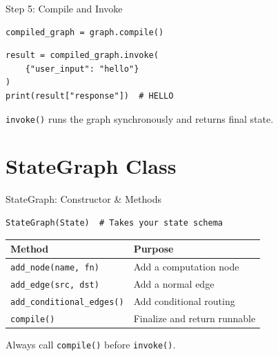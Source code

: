 \documentclass[aspectratio=169,11pt]{beamer}
\begin{document}
\begin{frame}[fragile,t]{Step 5: Compile and Invoke}
\vspace{0.1cm}

\begin{codebox}[Compile]
\begin{lstlisting}
compiled_graph = graph.compile()
\end{lstlisting}
\end{codebox}

\vspace{0.1cm}

\begin{codebox}[Invoke]
\begin{lstlisting}
result = compiled_graph.invoke(
    {"user_input": "hello"}
)
print(result["response"])  # HELLO
\end{lstlisting}
\end{codebox}

\vspace{0.1cm}

{\footnotesize \texttt{invoke()} runs the graph synchronously and returns final state.}
\end{frame}

\section{StateGraph Class}
\begin{frame}[fragile,t]{StateGraph: Constructor \& Methods}
\vspace{0.05cm}

\begin{codebox}[Constructor]
\begin{lstlisting}
StateGraph(State)  # Takes your state schema
\end{lstlisting}
\end{codebox}

\vspace{0.1cm}

\begin{tabular}{p{4.5cm}p{6.5cm}}
\toprule
\textbf{Method} & \textbf{Purpose} \\
\midrule
\texttt{add\_node(name, fn)} & Add a computation node \\
\texttt{add\_edge(src, dst)} & Add a normal edge \\
\texttt{add\_conditional\_edges()} & Add conditional routing \\
\texttt{compile()} & Finalize and return runnable \\
\bottomrule
\end{tabular}

\vspace{0.15cm}

{\footnotesize Always call \texttt{compile()} before \texttt{invoke()}.}
\end{frame}
\end{document}
